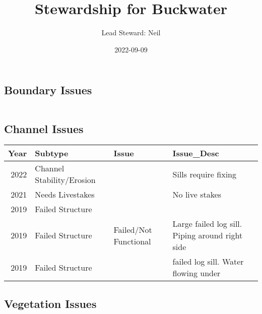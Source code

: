 \documentclass[
  landscape]{article}
\title{Stewardship for Buckwater}
\author{Lead Steward: Neil}
\date{2022-09-09}
\begin{document}
\maketitle

\hypertarget{boundary-issues}{%
\subsection{Boundary Issues}\label{boundary-issues}}

\begin{tabular}{}
\hline

\hline
\end{tabular}

\hypertarget{channel-issues}{%
\subsection{Channel Issues}\label{channel-issues}}

\begin{tabular}{r|l|l|l}
\hline
Year & Subtype & Issue & Issue\_Desc\\
\hline
2022 & Channel Stability/Erosion &  & Sills require fixing\\
\hline
2021 & Needs Livestakes &  & No live stakes\\
\hline
2019 & Failed Structure &  & \\
\hline
2019 & Failed Structure & Failed/Not Functional & Large failed log sill. Piping around right side\\
\hline
2019 & Failed Structure &  & failed log sill. Water flowing under\\
\hline
\end{tabular}

\hypertarget{vegetation-issues}{%
\subsection{Vegetation Issues}\label{vegetation-issues}}
\end{document}

